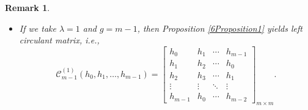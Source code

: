 \documentclass[12pt]{article}
\newtheorem{remark}{Remark}
\begin{document}
\begin{remark}
\begin{itemize}
$$\begin{bmatrix}
						h_1&h_{2}&\cdots&h_{0}
					\end{bmatrix}_{m\times m}.$$ 
						\item [(iv)] If we take $\lambda=1$ and $g=m-1$, then Proposition \ref{6Proposition1} yields \textit{left circulant matrix}, i.e., 
					$$\mathcal{C}_{m-1}^{(1)}(h_0, h_1, \ldots, h_{m-1})=\begin{bmatrix}
						h_0&h_1&\cdots &h_{m-1}\\
						h_{1}&h_{2}&\cdots&h_{0}\\
						h_{2}&h_{3}&\cdots&h_{1}\\
						\vdots&\vdots&\ddots&\vdots\\
						h_{m-1}&h_{0}&\cdots&h_{m-2}
					\end{bmatrix}_{m \times m}.$$ 
	\end{itemize}
\end{remark}
\end{document}
